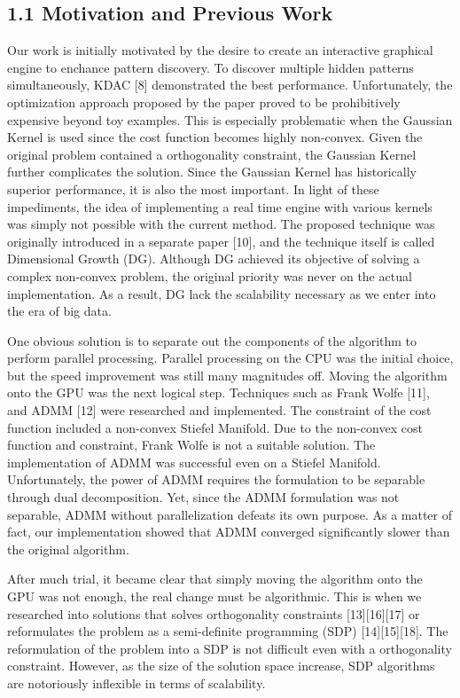 \documentclass{article}
\begin{document}
\subsection{1.1 Motivation and Previous Work}

Our work is initially motivated by the desire to create an interactive
graphical engine to enchance pattern discovery. To discover multiple hidden
patterns simultaneously, KDAC [8] demonstrated the best performance.
Unfortunately, the optimization approach proposed by the paper proved to be
prohibitively expensive beyond toy examples. This is especially problematic
when the Gaussian Kernel is used since the cost function becomes highly
non-convex. Given the original problem contained a orthogonality constraint,
the Gaussian Kernel further complicates the solution. Since the Gaussian
Kernel has historically superior performance, it is also the most important.
In light of these impediments, the idea of implementing a real time engine
with various kernels was simply not possible with the current method. The
proposed technique was originally introduced in a separate paper [10], and the
technique itself is called Dimensional Growth (DG). Although DG achieved its
objective of solving a complex non-convex problem, the original priority was
never on the actual implementation. As a result, DG lack the scalability
necessary as we enter into the era of big data.



One obvious solution is to separate out the components of the algorithm to
perform parallel processing. Parallel processing on the CPU was the initial
choice, but the speed improvement was still many magnitudes off. Moving the
algorithm onto the GPU was the next logical step. Techniques such as Frank
Wolfe [11], and ADMM [12] were researched and implemented. The constraint of
the cost function included a non-convex Stiefel Manifold. Due to the
non-convex cost function and constraint, Frank Wolfe is not a suitable
solution. The implementation of ADMM was successful even on a Stiefel
Manifold. Unfortunately, the power of ADMM requires the formulation to be
separable through dual decomposition. Yet, since the ADMM formulation was not
separable, ADMM without parallelization defeats its own purpose. As a matter
of fact, our implementation showed that ADMM converged significantly slower
than the original algorithm.

After much trial, it became clear that simply moving the algorithm onto the
GPU was not enough, the real change must be algorithmic. This is when we
researched into solutions that solves orthogonality constraints [13][16][17]
or reformulates the problem as a semi-definite programming (SDP) [14][15][18].
The reformulation of the problem into a SDP is not difficult even with a
orthogonality constraint. However, as the size of the solution space increase,
SDP algorithms are notoriously inflexible in terms of scalability.
\end{document}
